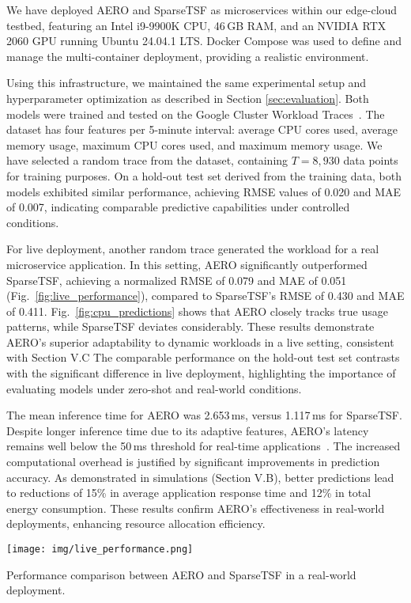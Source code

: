 \documentclass{ieeetmlcn}
\begin{document}
{\color{blue}
We have deployed AERO and SparseTSF as microservices within our edge-cloud testbed, featuring an Intel i9-9900K CPU, 46\,GB RAM, and an NVIDIA RTX 2060 GPU running Ubuntu 24.04.1 LTS. Docker Compose was used to define and manage the multi-container deployment, providing a realistic environment.

Using this infrastructure, we maintained the same experimental setup and hyperparameter optimization as described in Section \ref{sec:evaluation}. Both models were trained and tested on the Google Cluster Workload Traces~\cite{GoogleTrace}. The dataset has four features per 5-minute interval: average CPU cores used, average memory usage, maximum CPU cores used, and maximum memory usage. We have selected a random trace from the dataset, containing $T = 8,\!930$ data points for training purposes. On a hold-out test set derived from the training data, both models exhibited similar performance, achieving RMSE values of 0.020 and MAE of 0.007, indicating comparable predictive capabilities under controlled conditions.

For live deployment, another random trace generated the workload for a real microservice application. In this setting, AERO significantly outperformed SparseTSF, achieving a normalized RMSE of 0.079 and MAE of 0.051 (Fig.~\ref{fig:live_performance}), compared to SparseTSF's RMSE of 0.430 and MAE of 0.411. Fig.~\ref{fig:cpu_predictions} shows that AERO closely tracks true usage patterns, while SparseTSF deviates considerably. These results demonstrate AERO's superior adaptability to dynamic workloads in a live setting, consistent with Section V.C The comparable performance on the hold-out test set contrasts with the significant difference in live deployment, highlighting the importance of evaluating models under zero-shot and real-world conditions.

The mean inference time for AERO was 2.653\,ms, versus 1.117\,ms for SparseTSF. Despite longer inference time due to its adaptive features, AERO's latency remains well below the 50\,ms threshold for real-time applications~\cite{50mslatency}. The increased computational overhead is justified by significant improvements in prediction accuracy. As demonstrated in simulations (Section V.B), better predictions lead to reductions of 15\% in average application response time and 12\% in total energy consumption. These results confirm AERO's effectiveness in real-world deployments, enhancing resource allocation efficiency.
}

\par\medskip\begin{center}\centering
    \texttt{[image: img/live\_performance.png]}
    \caption{Performance comparison between AERO and SparseTSF in a real-world deployment.}
    \label{fig:live_performance}\end{center}\medskip\par
\end{document}
